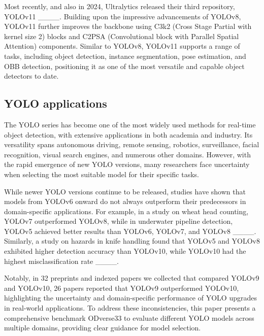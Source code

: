 Most recently, and also in 2024, Ultralytics released their third repository, YOLOv11 ____. Building upon the impressive advancements of YOLOv8, YOLOv11 further improves the backbone using C3k2 (Cross Stage Partial with kernel size 2) blocks and C2PSA (Convolutional block with Parallel Spatial Attention) components. Similar to YOLOv8, YOLOv11 supports a range of tasks, including object detection, instance segmentation, pose estimation, and OBB detection, positioning it as one of the most versatile and capable object detectors to date.





\subsection{YOLO applications}
The YOLO series has become one of the most widely used methods for real-time object detection, with extensive applications in both academia and industry. Its versatility spans autonomous driving, remote sensing, robotics, surveillance, facial recognition, visual search engines, and numerous other domains. However, with the rapid emergence of new YOLO versions, many researchers face uncertainty when selecting the most suitable model for their specific tasks.

While newer YOLO versions continue to be released, studies have shown that models from YOLOv6 onward do not always outperform their predecessors in domain-specific applications. For example, in a study on wheat head counting, YOLOv7 outperformed YOLOv8, while in underwater pipeline detection, YOLOv5 achieved better results than YOLOv6, YOLOv7, and YOLOv8 ____. Similarly, a study on hazards in knife handling found that YOLOv5 and YOLOv8 exhibited higher detection accuracy than YOLOv10, while YOLOv10 had the highest misclassification rate ____.

Notably, in 32 preprints and indexed papers we collected that compared YOLOv9 and YOLOv10, 26 papers reported that YOLOv9 outperformed YOLOv10, highlighting the uncertainty and domain-specific performance of YOLO upgrades in real-world applications. To address these inconsistencies, this paper presents a comprehensive benchmark ODverse33 to evaluate different YOLO models across multiple domains, providing clear guidance for model selection.